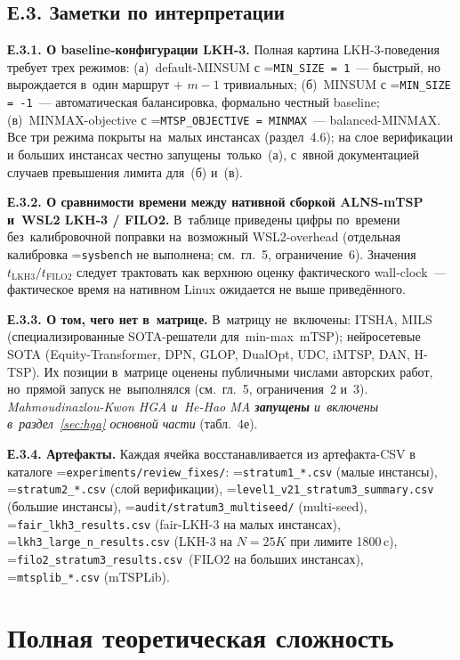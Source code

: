 \documentclass[a4paper,14pt]{extreport}
\makeatletter
\let\old@texttt\texttt
\renewcommand{\texttt}[1]{{\sloppy\hyphenchar\font=\m@ne\old@texttt{#1}}}
\makeatother
\begin{document}
\section*{Е.3. Заметки по интерпретации}

\textbf{Е.3.1. О baseline-конфигурации LKH-3.} Полная картина LKH-3-поведения требует трех режимов: (а)~default-MINSUM с \texttt{MIN\_SIZE = 1}~--- быстрый, но вырождается в~один маршрут + $m{-}1$ тривиальных; (б)~MINSUM с \texttt{MIN\_SIZE = -1}~--- автоматическая балансировка, формально честный baseline; (в)~MINMAX-objective с \texttt{MTSP\_OBJECTIVE = MINMAX}~--- balanced-MINMAX. Все три режима покрыты на~малых инстансах (раздел~4.6); на слое верификации и больших инстансах честно запущены~только~(а), с~явной документацией случаев превышения лимита для~(б) и~(в).

\textbf{Е.3.2. О сравнимости времени между нативной сборкой ALNS-mTSP и~WSL2 LKH-3 / FILO2.} В~таблице приведены цифры по~времени без~калибровочной поправки на~возможный WSL2-overhead (отдельная калибровка \texttt{sysbench} не выполнена; см.~гл.~5, ограничение~6). Значения $t_\mathrm{LKH3}/t_\mathrm{FILO2}$ следует трактовать как верхнюю оценку фактического wall-clock~--- фактическое время на нативном Linux ожидается не выше приведённого.

\textbf{Е.3.3. О том, чего нет в~матрице.} В~матрицу не~включены: ITSHA, MILS (специализированные SOTA-решатели для~min-max~mTSP); нейросетевые SOTA (Equity-Transformer, DPN, GLOP, DualOpt, UDC, iMTSP, DAN, H-TSP). Их позиции в~матрице оценены публичными числами авторских работ, но~прямой запуск не~выполнялся (см.~гл.~5, ограничения~2 и~3). \emph{Mahmoudinazlou-Kwon HGA и~He-Hao MA \textbf{запущены} и~включены в~раздел~\ref{sec:hga} основной части} (табл.~4е).

\textbf{Е.3.4. Артефакты.} Каждая ячейка восстанавливается из артефакта-CSV в каталоге \texttt{experiments/review\_fixes/}: \texttt{stratum1\_*.csv} (малые инстансы), \texttt{stratum2\_*.csv} (слой верификации), \texttt{level1\_v21\_stratum3\_summary.csv} (большие инстансы), \texttt{audit/stratum3\_multiseed/} (multi-seed), \texttt{fair\_lkh3\_results.csv} (fair-LKH-3 на малых инстансах), \texttt{lkh3\_large\_n\_results.csv} (LKH-3 на $N=25K$ при лимите 1800\,c), \texttt{filo2\_stratum3\_results.csv}~(FILO2 на больших инстансах), \texttt{mtsplib\_*.csv} (mTSPLib).

\chapter{Полная теоретическая сложность}
\label{ch:appendix-complexity}
\end{document}
